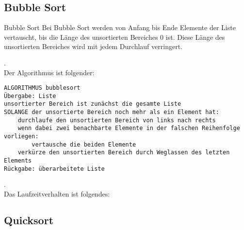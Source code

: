 \begin{table}[h]
\label{tab:my-table}
\end{table}


\subsection{Bubble Sort}

\begin{zitat}{Bubble Sort}
Bei Bubble Sort werden von Anfang bis Ende Elemente der Liste vertauscht, bis die Länge des unsortierten Bereiches 0 ist. Diese Länge des unsortierten Bereiches wird mit jedem Durchlauf verringert.
\end{zitat}
.\\
Der Algorithmus ist folgender:
\begin{lstlisting}
ALGORITHMUS bubblesort
Übergabe: Liste
unsortierter Bereich ist zunächst die gesamte Liste
SOLANGE der unsortierte Bereich noch mehr als ein Element hat:
    durchlaufe den unsortierten Bereich von links nach rechts
    wenn dabei zwei benachbarte Elemente in der falschen Reihenfolge vorliegen:
        vertausche die beiden Elemente
    verkürze den unsortierten Bereich durch Weglassen des letzten Elements
Rückgabe: überarbeitete Liste
\end{lstlisting}
.\\
Das Laufzeitverhalten ist folgendes:
\begin{table}[h]
\label{tab:my-table}
\end{table}



\subsection{Quicksort}


